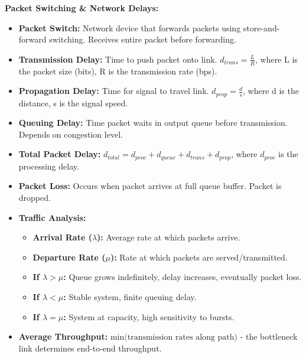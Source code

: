 \begin{minipage}[htp]{0.5\textwidth}
\noindent\textbf{Packet Switching \& Network Delays:}
\begin{itemize}[noitemsep,nolistsep,topsep=0px,partopsep=0pt,parsep=0pt]
    \item[-] \textbf{Packet Switch:} Network device that forwards packets using store-and-forward switching. Receives entire packet before forwarding.
    \item[-] \textbf{Transmission Delay:} Time to push packet onto link. $d_{trans} = \frac{L}{R}$, where L is the packet size (bits), R is the transmission rate (bps).
    \item[-] \textbf{Propagation Delay:} Time for signal to travel link. $d_{prop} = \frac{d}{s}$, where d is the distance, s is the signal speed.
    \item[-] \textbf{Queuing Delay:} Time packet waits in output queue before transmission. Depends on congestion level.
    \item[-] \textbf{Total Packet Delay:} $d_{total} = d_{proc} + d_{queue} + d_{trans} + d_{prop}$, where $d_{proc}$ is the processing delay.
    \item[-] \textbf{Packet Loss:} Occurs when packet arrives at full queue buffer. Packet is dropped.
    \item[-] \textbf{Traffic Analysis:}
    \begin{itemize}[noitemsep,nolistsep,topsep=0px,partopsep=0pt,parsep=0pt]
        \item \textbf{Arrival Rate ($\lambda$):} Average rate at which packets arrive.
        \item \textbf{Departure Rate ($\mu$):} Rate at which packets are served/transmitted.
        \item \textbf{If $\lambda > \mu$:} Queue grows indefinitely, delay increases, eventually packet loss.
        \item \textbf{If $\lambda < \mu$:} Stable system, finite queuing delay.
        \item \textbf{If $\lambda = \mu$:} System at capacity, high sensitivity to bursts.
    \end{itemize}
    \item[-] \textbf{Average Throughput:} $\text{min(transmission rates along path)}$ - the bottleneck link determines end-to-end throughput.
\end{itemize}
\end{minipage}
